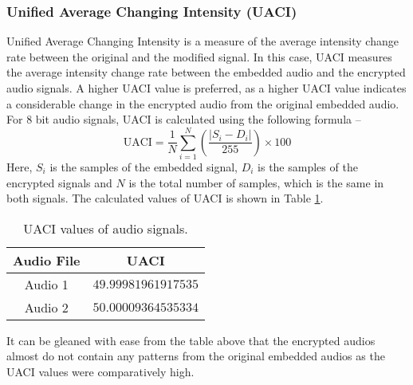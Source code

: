 \documentclass{article}
\begin{document}
\subsubsection{Unified Average Changing Intensity (UACI)}
Unified Average Changing Intensity is a measure of the average intensity change rate between the original and the modified signal. In this case, UACI measures the average intensity change rate between the embedded audio and the encrypted audio signals. A higher UACI value is preferred, as a higher UACI value indicates a considerable change in the encrypted audio from the original embedded audio. For 8 bit audio signals, UACI is calculated using the following formula --
\[\text{UACI}=\frac{1}{N}\sum_{i=1}^{N}\left(\frac{|S_i-D_i|}{255}\right)\times100\]
Here, $S_i$ is the samples of the embedded signal, $D_i$ is the samples of the encrypted signals and $N$ is the total number of samples, which is the same in both signals. The calculated values of UACI is shown in Table \ref{table:uaci}.
\begin{table}[!h]
    \begin{center}
        \caption{UACI values of audio signals.}
        \begin{tabular}{cc}
            \hline
            Audio File & UACI                \\ \hline
            Audio 1    & $49.99981961917535$ \\ \hdashline
            Audio 2    & $50.00009364535334$ \\ \hline
        \end{tabular}
        \label{table:uaci}
    \end{center}
\end{table}

It can be gleaned with ease from the table above that the encrypted audios almost do not contain any patterns from the original embedded audios as the UACI values were comparatively high.
\end{document}
